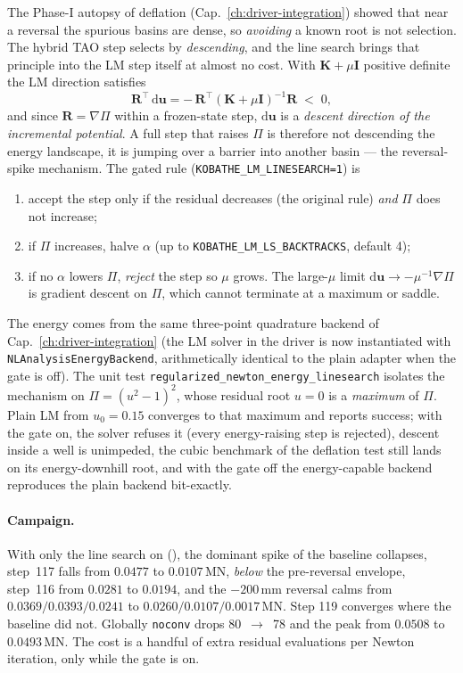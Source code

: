 The Phase-I autopsy of deflation (Cap.~\ref{ch:driver-integration})
showed that near a reversal the spurious basins are dense, so
\emph{avoiding} a known root is not selection. The hybrid TAO step
selects by \emph{descending}, and the line search brings that principle
into the LM step itself at almost no cost. With
$\mathbf K + \mu\mathbf I$ positive definite the LM direction satisfies
\[
  \mathbf R^{\top}\,\mathrm d\mathbf u
  = -\,\mathbf R^{\top}(\mathbf K+\mu\mathbf I)^{-1}\mathbf R \;<\; 0,
\]
and since $\mathbf R = \nabla\Pi$ within a frozen-state step,
$\mathrm d\mathbf u$ is a \emph{descent direction of the incremental
potential}. A full step that raises $\Pi$ is therefore not descending
the energy landscape, it is jumping over a barrier into another basin
--- the reversal-spike mechanism. The gated rule
(\texttt{KOBATHE\_LM\_LINESEARCH=1}) is
%
\begin{enumerate}
  \item accept the step only if the residual decreases (the original
        rule) \emph{and} $\Pi$ does not increase;
  \item if $\Pi$ increases, halve $\alpha$ (up to
        \texttt{KOBATHE\_LM\_LS\_BACKTRACKS}, default 4);
  \item if no $\alpha$ lowers $\Pi$, \emph{reject} the step so $\mu$
        grows. The large-$\mu$ limit
        $\mathrm d\mathbf u \to -\mu^{-1}\nabla\Pi$ is gradient descent
        on $\Pi$, which cannot terminate at a maximum or saddle.
\end{enumerate}
%
The energy comes from the same three-point quadrature backend of
Cap.~\ref{ch:driver-integration} (the LM solver in the driver is now
instantiated with \texttt{NLAnalysisEnergyBackend}, arithmetically
identical to the plain adapter when the gate is off). The unit test
\texttt{regularized\_newton\_energy\_linesearch} isolates the mechanism
on $\Pi=(u^2-1)^2$, whose residual root $u=0$ is a \emph{maximum} of
$\Pi$. Plain LM from $u_0=0.15$ converges to that maximum and reports
success; with the gate on, the solver refuses it (every energy-raising
step is rejected), descent inside a well is unimpeded, the cubic
benchmark of the deflation test still lands on its energy-downhill
root, and with the gate off the energy-capable backend reproduces the
plain backend bit-exactly.

\paragraph{Campaign.} With only the line search on
(), the dominant spike of the baseline
collapses, step~117 falls from $0.0477$ to $0.0107$\,MN, \emph{below}
the pre-reversal envelope, step~116 from $0.0281$ to $0.0194$, and the
$-200$\,mm reversal calms from $0.0369/0.0393/0.0241$ to
$0.0260/0.0107/0.0017$\,MN. Step 119 converges where the baseline did
not. Globally \texttt{noconv} drops 80~$\to$~78 and the peak from
$0.0508$ to $0.0493$\,MN. The cost is a handful of extra residual
evaluations per Newton iteration, only while the gate is on.

